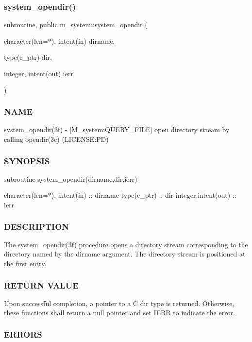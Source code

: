 \subsubsection{\texorpdfstring{system\+\_\+opendir()}{system\_opendir()}}
{\footnotesize\ttfamily subroutine, public m\+\_\+system\+::system\+\_\+opendir (\begin{DoxyParamCaption}\item[{character(len=$\ast$), intent(in)}]{dirname,  }\item[{type(c\+\_\+ptr)}]{dir,  }\item[{integer, intent(out)}]{ierr }\end{DoxyParamCaption})}



\subsubsection*{N\+A\+ME}

system\+\_\+opendir(3f) -\/ \mbox{[}M\+\_\+system\+:Q\+U\+E\+R\+Y\+\_\+\+F\+I\+LE\mbox{]} open directory stream by calling opendir(3c) (L\+I\+C\+E\+N\+SE\+:PD) \subsubsection*{S\+Y\+N\+O\+P\+S\+IS}

subroutine system\+\_\+opendir(dirname,dir,ierr)

character(len=$\ast$), intent(in) \+:\+: dirname type(c\+\_\+ptr) \+:\+: dir integer,intent(out) \+:\+: ierr

\subsubsection*{D\+E\+S\+C\+R\+I\+P\+T\+I\+ON}

The system\+\_\+opendir(3f) procedure opens a directory stream corresponding to the directory named by the dirname argument. The directory stream is positioned at the first entry.

\subsubsection*{R\+E\+T\+U\+RN V\+A\+L\+UE}

Upon successful completion, a pointer to a C dir type is returned. Otherwise, these functions shall return a null pointer and set I\+E\+RR to indicate the error.

\subsubsection*{E\+R\+R\+O\+RS}

